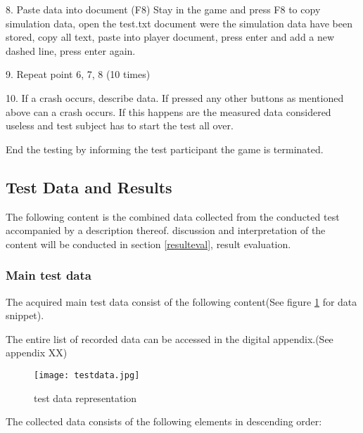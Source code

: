8.	Paste data into document (F8)
Stay in the game and press F8 to copy simulation data, open the test.txt document were the simulation data have been stored, copy all text, paste into player document, press enter and add a new dashed line, press enter again.

9.	Repeat point 6, 7, 8 (10 times)

10.	If a crash occurs, describe data.
If pressed any other buttons as mentioned above can a crash occurs. If this happens are the measured data considered useless and test subject has to start the test all over.

End the testing by informing the test participant the game is terminated.



\newpage
\subsection{Test Data and Results}
The following content is the combined data collected from the conducted test accompanied by a description thereof. discussion and interpretation of the content will be conducted in section \ref{resulteval}, result evaluation.

\subsubsection{Main test data}
The acquired main test data consist of the following content(See figure \ref{fig:testdata} for data snippet).

The entire list of recorded data can be accessed in the digital appendix.(See appendix XX)

\begin{figure}[!htbp]
\centering
\texttt{[image: testdata.jpg]}
\caption{test data representation}
\label{fig:testdata}
\end{figure}


\newpage

The collected data consists of the following elements in descending order:

